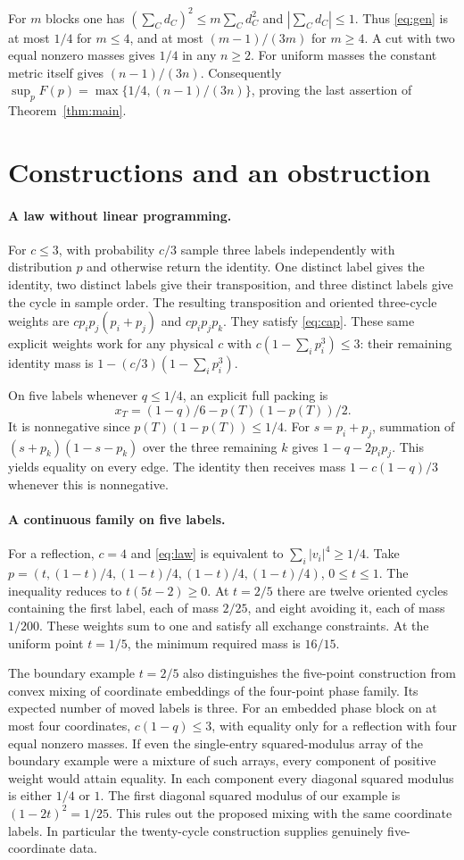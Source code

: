 \documentclass[11pt]{article}
\begin{document}
For $m$ blocks one has $(\sum_C d_C)^2\le m\sum_C d_C^2$ and $|\sum_C d_C|\le1$. Thus \eqref{eq:gen} is at most $1/4$ for $m\le4$, and at most $(m-1)/(3m)$ for $m\ge4$. A cut with two equal nonzero masses gives $1/4$ in any $n\ge2$. For uniform masses the constant metric itself gives $(n-1)/(3n)$. Consequently $\sup_p F(p)=\max\{1/4,(n-1)/(3n)\}$, proving the last assertion of Theorem~\ref{thm:main}.

\section{Constructions and an obstruction}
\paragraph{A law without linear programming.}
For $c\le3$, with probability $c/3$ sample three labels independently with distribution $p$ and otherwise return the identity. One distinct label gives the identity, two distinct labels give their transposition, and three distinct labels give the cycle in sample order. The resulting transposition and oriented three-cycle weights are $cp_i p_j(p_i+p_j)$ and $cp_i p_j p_k$. They satisfy \eqref{eq:cap}. These same explicit weights work for any physical $c$ with $c(1-\sum_i p_i^3)\le3$: their remaining identity mass is $1-(c/3)(1-\sum_i p_i^3)$.

On five labels whenever $q\le1/4$, an explicit full packing is
\[
 x_T=(1-q)/6-p(T)(1-p(T))/2 .
\]
It is nonnegative since $p(T)(1-p(T))\le1/4$. For $s=p_i+p_j$, summation of $(s+p_k)(1-s-p_k)$ over the three remaining $k$ gives $1-q-2p_i p_j$. This yields equality on every edge. The identity then receives mass $1-c(1-q)/3$ whenever this is nonnegative.

\paragraph{A continuous family on five labels.}
For a reflection, $c=4$ and \eqref{eq:law} is equivalent to $\sum_i|v_i|^4\ge1/4$. Take $p=(t,(1-t)/4,(1-t)/4,(1-t)/4,(1-t)/4)$, $0\le t\le1$. The inequality reduces to $t(5t-2)\ge0$. At $t=2/5$ there are twelve oriented cycles containing the first label, each of mass $2/25$, and eight avoiding it, each of mass $1/200$. These weights sum to one and satisfy all exchange constraints. At the uniform point $t=1/5$, the minimum required mass is $16/15$.

The boundary example $t=2/5$ also distinguishes the five-point construction from convex mixing of coordinate embeddings of the four-point phase family. Its expected number of moved labels is three. For an embedded phase block on at most four coordinates, $c(1-q)\le3$, with equality only for a reflection with four equal nonzero masses. If even the single-entry squared-modulus array of the boundary example were a mixture of such arrays, every component of positive weight would attain equality. In each component every diagonal squared modulus is either $1/4$ or $1$. The first diagonal squared modulus of our example is $(1-2t)^2=1/25$. This rules out the proposed mixing with the same coordinate labels. In particular the twenty-cycle construction supplies genuinely five-coordinate data.
\end{document}
